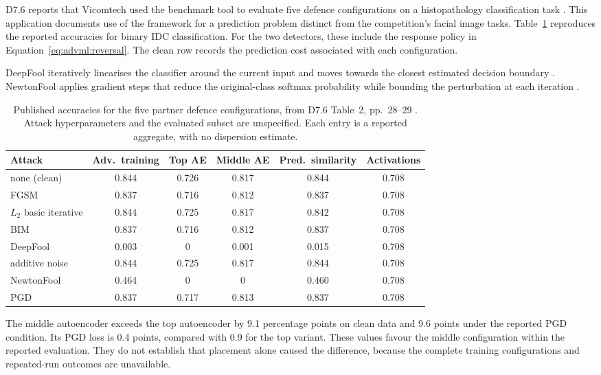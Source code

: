 D7.6 reports that Vicomtech used the benchmark tool to evaluate five defence configurations
on a histopathology classification task \cite[Section~3.1.3]{sparta2022d76}. This application
documents use of the framework for a prediction problem distinct from the competition's facial
image tasks. Table~\ref{tab:advml:benchmark} reproduces the reported accuracies for binary IDC
classification. For the two detectors, these include the response policy in
Equation~\ref{eq:advml:reversal}. The clean row records the prediction cost associated with
each configuration.

DeepFool iteratively linearises the classifier around the current input and moves towards the
closest estimated decision boundary \cite{moosavi2016deepfool}. NewtonFool applies gradient
steps that reduce the original-class softmax probability while bounding the perturbation at
each iteration \cite{jang2017objective}.

\begin{table}[tbp]
  \caption{Published accuracies for the five partner defence configurations, from D7.6
    Table~2, pp.~28--29 \cite{sparta2022d76}. Attack hyperparameters and the evaluated
    subset are unspecified. Each entry is a reported aggregate, with no dispersion estimate.}
  \label{tab:advml:benchmark}
  \centering\small
  \begin{tabular}{@{}lccccc@{}}
    \toprule
    Attack & Adv.\ training & Top AE & Middle AE & Pred.\ similarity & Activations \\
    \midrule
    none (clean) & 0.844 & 0.726 & 0.817 & 0.844 & 0.708 \\
    FGSM & 0.837 & 0.716 & 0.812 & 0.837 & 0.708 \\
    $L_2$ basic iterative & 0.844 & 0.725 & 0.817 & 0.842 & 0.708 \\
    BIM & 0.837 & 0.716 & 0.812 & 0.837 & 0.708 \\
    DeepFool & 0.003 & 0 & 0.001 & 0.015 & 0.708 \\
    additive noise & 0.844 & 0.725 & 0.817 & 0.844 & 0.708 \\
    NewtonFool & 0.464 & 0 & 0 & 0.460 & 0.708 \\
    PGD & 0.837 & 0.717 & 0.813 & 0.837 & 0.708 \\
    \bottomrule
  \end{tabular}
\end{table}

The middle autoencoder exceeds the top autoencoder by 9.1 percentage points on clean data
and 9.6 points under the reported PGD condition. Its PGD loss is 0.4 points, compared with
0.9 for the top variant. These values favour the middle configuration within the reported
evaluation. They do not establish that placement alone caused the difference, because the
complete training configurations and repeated-run outcomes are unavailable.

